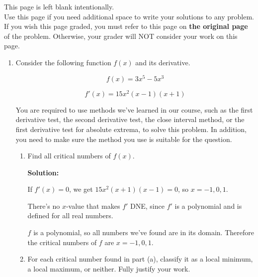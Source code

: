 \documentclass[11pt]{article}
\begin{document}
{    }

\vfill


\newpage

This page is left blank intentionally.\\

Use this page if you need additional space to write your solutions to any problem. \\

If you wish this page graded, you must refer to this page on \textbf{the original page} of the problem. Otherwise, your grader will NOT consider your work on this page.

\newpage%


\begin{enumerate}


\item Consider the following function $f(x)$ and its derivative.

\[f(x)=3x^5-5x^3\]%

\[f'(x)=15x^2(x-1)(x+1)\]%

You are required to use methods we've learned in our course, such as the first derivative test, the second derivative test, the close interval method, or the first derivative test for absolute extrema, to solve this problem. In addition, you need to make sure the method you use is suitable for the question.

\begin{enumerate}
    \item Find all critical numbers of $f(x)$.

    {\color{blue}\textbf{Solution:}

    If $f'(x)=0$, we get $15x^2(x+1)(x-1)=0$, so $x=-1, 0, 1$.

    There's no $x$-value that makes $f'$ DNE, since $f'$ is a polynomial and is defined for all real numbers.

    $f$ is a polynomial, so all numbers we've found are in its domain. Therefore the critical numbers of $f$ are $x=-1, 0, 1$.

    }

    \item For each critical number found in part (a), classify it as a local minimum, a local maximum, or neither. Fully justify your work.
    

\end{enumerate}
\end{enumerate}
\end{document}
